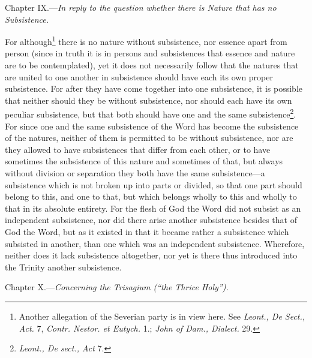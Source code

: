 
Chapter IX.—\emph{In reply to the question whether there is Nature that has no Subsistence.}

For although\footnote{Another allegation of the Severian party is in view here. See \emph{Leont., De Sect., Act. }7, \emph{Contr. Nestor. et Eutych. }1.; \emph{John of Dam., Dialect. }29.} there is no nature without subsistence, nor essence apart from person (since in truth it is in persons and subsistences that essence and nature are to be contemplated), yet it does not necessarily follow that the natures that are united to one another in subsistence should have each its own proper subsistence. For after they have come together into one subsistence, it is possible that neither should they be without subsistence, nor should each have its own peculiar subsistence, but that both should have one and the same subsistence\footnote{\emph{Leont., De sect., Act }7.}. For since one and the same subsistence of the Word has become the subsistence of the natures, neither of them is permitted to be without subsistence, nor are they allowed to have subsistences that differ from each other, or to have sometimes the subsistence of this nature and sometimes of that, but always without division or separation they both have the same subsistence—a subsistence which is not broken up into parts or divided, so that one part should belong to this, and one to that, but which belongs wholly to this and wholly to that in its absolute entirety. For the flesh of God the Word did not subsist as an independent subsistence, nor did there arise another subsistence besides that of God the Word, but as it existed in that it became rather a subsistence which subsisted in another, than one which was an independent subsistence. Wherefore, neither does it lack subsistence altogether, nor yet is there thus introduced into the Trinity another subsistence.


Chapter X.—\emph{Concerning the Trisagium (“the Thrice Holy”).}

